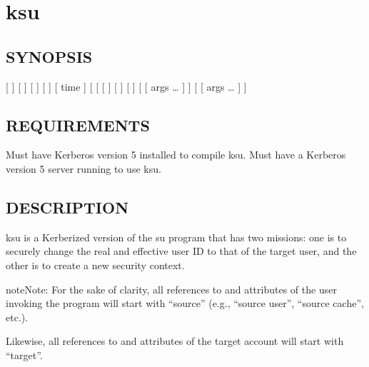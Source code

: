 \documentclass[letterpaper,10pt,english]{sphinxmanual}
\begin{document}
\section{ksu}
\label{\detokenize{user/user_commands/ksu:ksu-1}}\label{\detokenize{user/user_commands/ksu:ksu}}\label{\detokenize{user/user_commands/ksu::doc}}

\subsection{SYNOPSIS}
\label{\detokenize{user/user_commands/ksu:synopsis}}
{[}  {]}
{[}   {]}
{[}   {]}
{[}  {]}
{[}  time {]}
{[}  \textbar{} \sphinxstylestrong{-P}{]}
{[}  \textbar{} \sphinxstylestrong{-F}{]}
{[}   {]}
{[}  {]}
{[}  {]}
{[}   {[} args …  {]} {]} {[}  {[} args …  {]} {]}


\subsection{REQUIREMENTS}
\label{\detokenize{user/user_commands/ksu:requirements}}
Must have Kerberos version 5 installed to compile ksu.  Must have a
Kerberos version 5 server running to use ksu.


\subsection{DESCRIPTION}
\label{\detokenize{user/user_commands/ksu:description}}
ksu is a Kerberized version of the su program that has two missions:
one is to securely change the real and effective user ID to that of
the target user, and the other is to create a new security context.

\begin{sphinxadmonition}{note}{Note:}
For the sake of clarity, all references to and attributes of
the user invoking the program will start with “source”
(e.g., “source user”, “source cache”, etc.).

Likewise, all references to and attributes of the target
account will start with “target”.
\end{sphinxadmonition}
\end{document}
